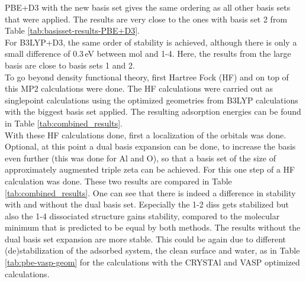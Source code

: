 \documentclass[11pt,DIV=13,BCOR=5mm,a4paper,headinclude]{scrbook}
\begin{document}
PBE+D3 with the new basis set gives the same ordering as all other basis sets that were applied.
The results are very close to the ones with basis set 2 from Table \ref{tab:basisset-results-PBE+D3}.
\\
For B3LYP+D3, the same order of stability is achieved, although there is only a small difference of $0.3\,$eV between mol and 1-4.
Here, the results from the large basis are close to basis sets 1 and 2.
\\
To go beyond density functional theory, first Hartree Fock (HF) and on top of this MP2 calculations were done.
The HF calculations were carried out as singlepoint calculations using the optimized geometries from B3LYP calculations with the biggest basis set applied.
The resulting adsorption energies can be found in Table \ref{tab:combined_results}. %
\\
With these HF calculations done, first a localization of the orbitals was done.
Optional, at this point a dual basis expansion can be done, to increase the basis even further (this was done for Al and O), so that a basis set of the size of approximately augmented triple zeta can be achieved.
For this one step of a HF calculation was done.
These two results are compared in Table \ref{tab:combined_results}. %
One can see that there is indeed a difference in stability with and without the dual basis set.
Especially the 1-2 diss gets stabilized but also the 1-4 dissociated structure gains stability, compared to the molecular minimum that is predicted to be equal by both methods.
The results without the dual basis set expansion are more stable.
This could be again due to different (de)stabilization of the adsorbed system, the clean surface and water, as in Table \ref{tab:pbe-vasp-geom} for the calculations with the CRYSTAl and VASP optimized calculations.
\end{document}
